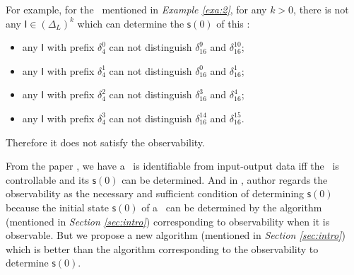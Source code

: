 
\begin{example}
For example, for the \BCN\ mentioned in {\em Example \ref{exa:2}}, for any $k>0$, there is not any $\mathsf{I}\in(\Delta_L)^k$ which can determine the $\mathsf{s}(0)$ of this \BCN:
\begin{itemize}
  \item any $\mathsf{I}$ with prefix $\delta_{4}^0$ can not distinguish $\delta_{16}^9$ and $\delta_{16}^{10}$;
  \item any $\mathsf{I}$ with prefix $\delta_{4}^1$ can not distinguish $\delta_{16}^0$ and $\delta_{16}^{1}$;
  \item any $\mathsf{I}$ with prefix $\delta_{4}^2$ can not distinguish $\delta_{16}^3$ and $\delta_{16}^{4}$;
  \item any $\mathsf{I}$ with prefix $\delta_{4}^3$ can not distinguish $\delta_{16}^{14}$ and $\delta_{16}^{15}$.
\end{itemize} 
Therefore it does not satisfy the observability. 
\label{exa:6}
\end{example}  

From the paper \cite{Cheng2011Identification}, we have a \BCN\ is identifiable from input-output data iff the \BCN\ is controllable and its $\mathsf{s}(0)$ can be determined. And in \cite{Cheng2011Identification}, author regards the observability as the necessary and sufficient condition of determining $\mathsf{s}(0)$ because the initial state $\mathsf{s}(0)$ of a \BCN\ can be determined by the algorithm (mentioned in {\em Section \ref{sec:intro}}) corresponding to observability when it is observable. But we propose a new algorithm (mentioned in {\em Section \ref{sec:intro}}) which is better than the  algorithm corresponding to the observability to determine $\mathsf{s}(0)$. 




